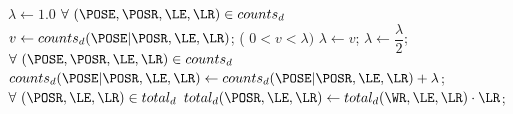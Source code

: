 \pagebreak


{ %
\begin{codebox}
	\li 		$\lambda \gets 1.0 $ 
	\li 		$\forall \ (\POSE, \POSR, \LE, \LR) \in  counts_d $ \Do 	
	\li 			$ v \gets counts_d(\POSE|\POSR, \LE, \LR)$;
	\li 			{} ( $0 < v < \lambda)$ \Do 	
	\li					$\lambda \gets v $;
					\End
	\li				$\lambda \gets \dfrac{\lambda}{2}$;
				\End
	\li 		$\forall \ (\POSE, \POSR, \LE, \LR) \in  counts_d $ \Do 	
	\li 			$ counts_d(\POSE|\POSR, \LE, \LR) \gets counts_d(\POSE|\POSR, \LE, \LR) +  \lambda$;
				\End
	\li 		$\forall \ (\POSR, \LE, \LR) \in  total_d $ \Do 	
	\li 			$ total_d(\POSR, \LE, \LR) \gets total_d(\WR, \LE, \LR) \cdot  \LR$;
	\li			\End
\end{codebox}
}

\pagebreak
